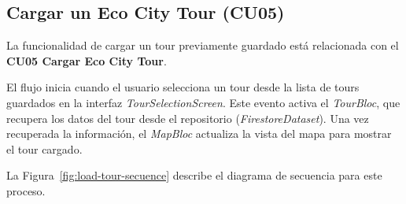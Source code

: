 \subsection{Cargar un Eco City Tour (CU05)}
La funcionalidad de cargar un tour previamente guardado está relacionada con el \textbf{CU05 Cargar Eco City Tour}.

El flujo inicia cuando el usuario selecciona un tour desde la lista de tours guardados en la interfaz \textit{TourSelectionScreen}. Este evento activa el \textit{TourBloc}, que recupera los datos del tour desde el repositorio (\textit{FirestoreDataset}). Una vez recuperada la información, el \textit{MapBloc} actualiza la vista del mapa para mostrar el tour cargado.

La Figura~\ref{fig:load-tour-secuence} describe el diagrama de secuencia para este proceso.

